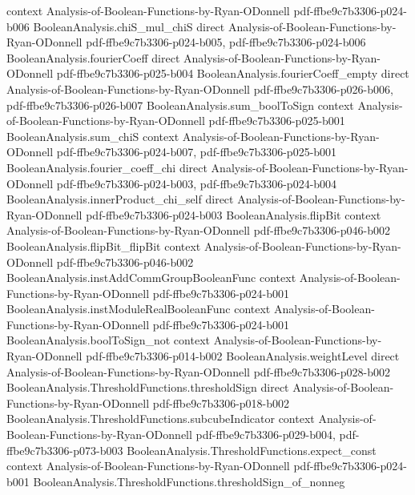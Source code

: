 \begin{theorem}
  {context}
  {Analysis-of-Boolean-Functions-by-Ryan-ODonnell}
  {pdf-ffbe9c7b3306-p024-b006}
\proofstep
  {BooleanAnalysis.chiS_mul_chiS}
  {direct}
  {Analysis-of-Boolean-Functions-by-Ryan-ODonnell}
  {pdf-ffbe9c7b3306-p024-b005,
    pdf-ffbe9c7b3306-p024-b006}
\proofstep
  {BooleanAnalysis.fourierCoeff}
  {direct}
  {Analysis-of-Boolean-Functions-by-Ryan-ODonnell}
  {pdf-ffbe9c7b3306-p025-b004}
\proofstep
  {BooleanAnalysis.fourierCoeff_empty}
  {direct}
  {Analysis-of-Boolean-Functions-by-Ryan-ODonnell}
  {pdf-ffbe9c7b3306-p026-b006,
    pdf-ffbe9c7b3306-p026-b007}
\proofstep
  {BooleanAnalysis.sum_boolToSign}
  {context}
  {Analysis-of-Boolean-Functions-by-Ryan-ODonnell}
  {pdf-ffbe9c7b3306-p025-b001}
\proofstep
  {BooleanAnalysis.sum_chiS}
  {context}
  {Analysis-of-Boolean-Functions-by-Ryan-ODonnell}
  {pdf-ffbe9c7b3306-p024-b007,
    pdf-ffbe9c7b3306-p025-b001}
\proofstep
  {BooleanAnalysis.fourier_coeff_chi}
  {direct}
  {Analysis-of-Boolean-Functions-by-Ryan-ODonnell}
  {pdf-ffbe9c7b3306-p024-b003,
    pdf-ffbe9c7b3306-p024-b004}
\proofstep
  {BooleanAnalysis.innerProduct_chi_self}
  {direct}
  {Analysis-of-Boolean-Functions-by-Ryan-ODonnell}
  {pdf-ffbe9c7b3306-p024-b003}
\proofstep
  {BooleanAnalysis.flipBit}
  {context}
  {Analysis-of-Boolean-Functions-by-Ryan-ODonnell}
  {pdf-ffbe9c7b3306-p046-b002}
\proofstep
  {BooleanAnalysis.flipBit_flipBit}
  {context}
  {Analysis-of-Boolean-Functions-by-Ryan-ODonnell}
  {pdf-ffbe9c7b3306-p046-b002}
\proofstep
  {BooleanAnalysis.instAddCommGroupBooleanFunc}
  {context}
  {Analysis-of-Boolean-Functions-by-Ryan-ODonnell}
  {pdf-ffbe9c7b3306-p024-b001}
\proofstep
  {BooleanAnalysis.instModuleRealBooleanFunc}
  {context}
  {Analysis-of-Boolean-Functions-by-Ryan-ODonnell}
  {pdf-ffbe9c7b3306-p024-b001}
\proofstep
  {BooleanAnalysis.boolToSign_not}
  {context}
  {Analysis-of-Boolean-Functions-by-Ryan-ODonnell}
  {pdf-ffbe9c7b3306-p014-b002}
\proofstep
  {BooleanAnalysis.weightLevel}
  {direct}
  {Analysis-of-Boolean-Functions-by-Ryan-ODonnell}
  {pdf-ffbe9c7b3306-p028-b002}
\proofstep
  {BooleanAnalysis.ThresholdFunctions.thresholdSign}
  {direct}
  {Analysis-of-Boolean-Functions-by-Ryan-ODonnell}
  {pdf-ffbe9c7b3306-p018-b002}
\proofstep
  {BooleanAnalysis.ThresholdFunctions.subcubeIndicator}
  {context}
  {Analysis-of-Boolean-Functions-by-Ryan-ODonnell}
  {pdf-ffbe9c7b3306-p029-b004,
    pdf-ffbe9c7b3306-p073-b003}
\proofstep
  {BooleanAnalysis.ThresholdFunctions.expect_const}
  {context}
  {Analysis-of-Boolean-Functions-by-Ryan-ODonnell}
  {pdf-ffbe9c7b3306-p024-b001}
\proofstep
  {BooleanAnalysis.ThresholdFunctions.thresholdSign_of_nonneg}

\end{theorem}
